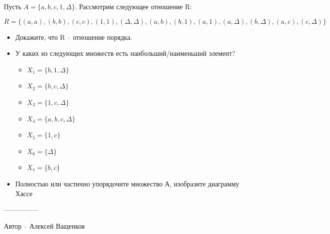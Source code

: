 \question
Пусть $A = \{a, b, c, 1, \Delta\}$. Рассмотрим следующее отношение R:

\begin{equation*}
R = \{(a, a), (b, b), (c, c), (1, 1),
(\Delta, \Delta), (a, b), (b, 1), (a, 1),
(a, \Delta), (b, \Delta), (a, c), (c, \Delta)\}
\end{equation*}
\begin{itemize}
    \item Докажите, что R -- отношение порядка.
    \item У каких из следующих множеств есть наибольший/наименьший элемент?
    \begin{itemize}
        \item $X_1 = \{b, 1, \Delta\}$
        \item $X_2 = \{b, c, \Delta\}$
        \item $X_3 = \{1, c, \Delta\}$
        \item $X_4 = \{a, b, c, \Delta\}$
        \item $X_5 = \{1, c\}$
        \item $X_6 = \{ \Delta \}$
        \item $X_7 = \{b, c\}$
    \end{itemize}
    \item Полностью или частично упорядочите множество А, изобразите диаграмму Хассе
\end{itemize}

---------------

Автор -- Алексей Ващенков